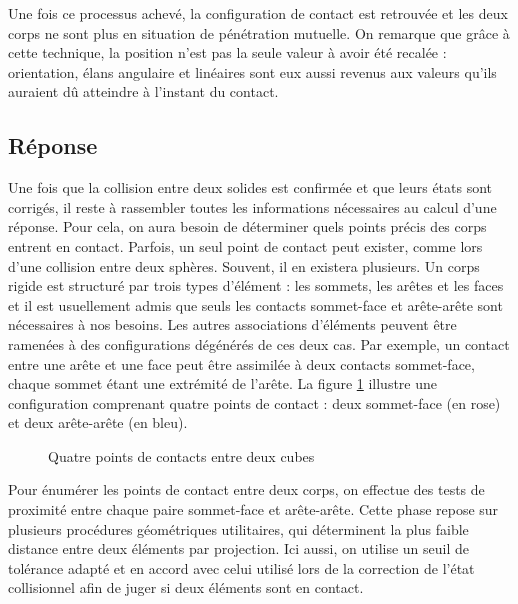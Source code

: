 Une fois ce processus achevé, la configuration de contact est
retrouvée et les deux corps ne sont plus en situation de pénétration
mutuelle. On remarque que grâce à cette technique, la position n'est
pas la seule valeur à avoir été recalée : orientation, élans angulaire
et linéaires sont eux aussi revenus aux valeurs qu'ils auraient dû
atteindre à l'instant du contact.

\subsection{Réponse}

Une fois que la collision entre deux solides est confirmée et que
leurs états sont corrigés, il reste à rassembler toutes les
informations nécessaires au calcul d'une réponse. Pour cela, on aura
besoin de déterminer quels points précis des corps entrent en contact.
Parfois, un seul point de contact peut exister, comme lors d'une
collision entre deux sphères. Souvent, il en existera plusieurs. Un
corps rigide est structuré par trois types d'élément : les sommets,
les arêtes et les faces et il est usuellement admis que seuls les
contacts sommet-face et arête-arête sont nécessaires à nos
besoins. Les autres associations d'éléments peuvent être ramenées à
des configurations dégénérés de ces deux cas. Par exemple, un contact
entre une arête et une face peut être assimilée à deux contacts
sommet-face, chaque sommet étant une extrémité de l'arête. La figure
\ref{contacts} illustre une configuration comprenant quatre points de
contact : deux sommet-face (en rose) et deux arête-arête (en bleu).

\begin{figure}
  \centering
  \subfloat{
    
    
  }
  \caption{Quatre points de contacts entre deux cubes}
  \label{contacts}
\end{figure}

Pour énumérer les points de contact entre deux corps, on effectue des
tests de proximité entre chaque paire sommet-face et
arête-arête. Cette phase repose sur plusieurs procédures géométriques
utilitaires, qui déterminent la plus faible distance entre deux
éléments par projection. Ici aussi, on utilise un seuil de tolérance
adapté et en accord avec celui utilisé lors de la correction de l'état
collisionnel afin de juger si deux éléments sont en contact.

